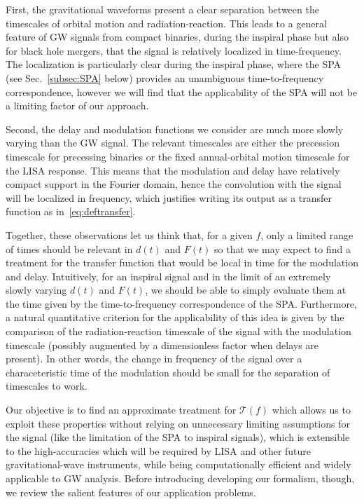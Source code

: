 \documentclass[aps,showpacs,twocolumn,
prd,superscriptaddress,nofootinbib]{revtex4-1}
\newcommand\calT{{\mathcal{T}}}
\begin{document}
First, the gravitational waveforms present a clear separation between the timescales of orbital motion and radiation-reaction. This leads to a general feature of GW signals from compact binaries, during the inspiral phase but also for black hole mergers, that the signal is relatively localized in time-frequency. The localization is particularly clear during the inspiral phase, where the SPA (see Sec.~\ref{subsec:SPA} below) provides an unambiguous time-to-frequency correspondence, however we will find that the applicability of the SPA will not be a limiting factor of our approach.

Second, the delay and modulation functions we consider are much more slowly varying than the GW signal. The relevant timescales are either the precession timescale for precessing binaries or the fixed annual-orbital motion timescale for the LISA response. This means that the modulation and delay have relatively compact support in the Fourier domain, hence the convolution with the signal will be localized in frequency, which justifies writing its output as a transfer function as in~\eqref{eq:deftransfer}.

Together, these observations let us think that, for a given $f$, only a limited range of times should be relevant in $d(t)$ and $F(t)$ so that we may expect to find a treatment for the transfer function that would be local in time for the modulation and delay. Intuitively, for an inspiral signal and in the limit of an extremely slowly varying $d(t)$ and $F(t)$, we should be able to simply evaluate them at the time given by the time-to-frequency correspondence of the SPA. Furthermore, a natural quantitative criterion for the applicability of this idea is given by the comparison of the radiation-reaction timescale of the signal with the modulation timescale (possibly augmented by a dimensionless factor when delays are present). In other words, the change in frequency of the signal over a characeteristic time of the modulation should be small for the separation of timescales to work.

Our objective is to find an approximate treatment for $\calT(f)$ which allows us to exploit these properties without relying on unnecessary limiting assumptions for the signal (like the limitation of the SPA to inspiral signals), which is extensible to the high-accuracies which will be required by LISA and other future gravitational-wave instruments, while being computationally efficient and widely applicable to GW analysis. Before introducing developing our formalism, though, we review the salient features of our application problems.
\end{document}
